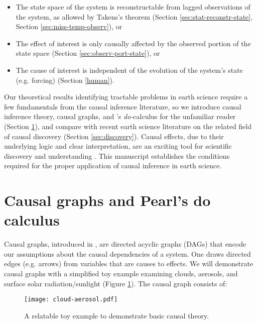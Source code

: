 \documentclass[12pt]{article}
\begin{document}
\begin{itemize}
\item The state space of the system is reconstructable
  from lagged observations of the system, as allowed by
  Takens's theorem (Section \ref{sec:stat-reconstr-state}, Section \ref{sec:miss-temp-observ}), or
\item The effect of interest is only causally affected by the observed
  portion of the state space (Section \ref{sec:observ-port-state}), or
\item The cause of interest is independent of the evolution of the
  system's state (e.g. forcing) (Section \ref{human}).
\end{itemize}

Our theoretical
results identifying tractable problems in earth science require a few
fundamentals from the causal inference literature, so we introduce
causal inference theory, causal graphs, and \citet{pearl2009}'s
\textit{do-}calculus for the unfamiliar reader (Section
\ref{sec:causal-graphs-pearls}), and compare with recent earth science
literature on the related field of causal discovery (Section
\ref{sec:discovery}). Causal effects, due to their underlying logic
and clear interpretation, are an exciting tool for scientific
discovery and understanding \citep{hannart-da,naveau-2020}. This
manuscript establishes the conditions required for the proper
application of causal inference in earth science.

\section{Causal graphs and Pearl's do calculus}
\label{sec:causal-graphs-pearls}

Causal graphs, introduced in \citep{pearl1995causal}, are directed
acyclic graphs (DAGs) that encode our assumptions about the causal
dependencies of a system. One draws directed edges (e.g. arrows) from
variables that are causes to effects. We will demonstrate causal
graphs with a simplified toy example examining clouds, aerosols, and
surface solar radiation/sunlight (Figure \ref{fig:toy}). The causal
graph consists of:

\begin{figure}
  \texttt{[image: cloud-aerosol.pdf]}\\
  \caption{A relatable toy example to demonstrate basic causal theory.}
  \label{fig:toy}
\end{figure}
\end{document}
